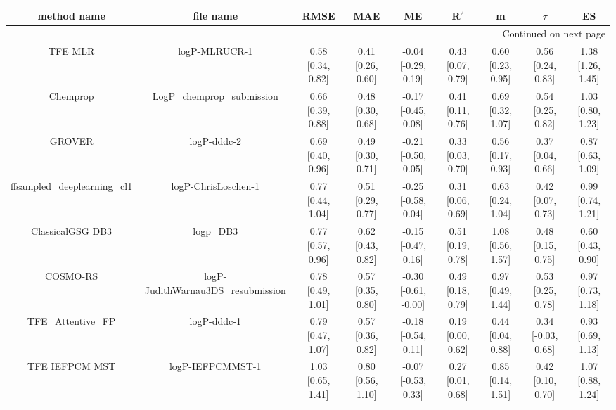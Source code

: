\documentclass{article}
\begin{document}
\begin{center}
\scriptsize
\begin{longtable}{|ccccccccc|}
\toprule
                method name &                                   file name &               RMSE &                MAE &                    ME &              R$^2$ &                     m &                $\tau$ &                    ES \\
\midrule
\endhead
\midrule
\multicolumn{9}{r}{{Continued on next page}} \\
\midrule
\endfoot

\bottomrule
\endlastfoot
                    TFE MLR &                               logP-MLRUCR-1 &  0.58 [0.34, 0.82] &  0.41 [0.26, 0.60] &   -0.04 [-0.29, 0.19] &  0.43 [0.07, 0.79] &     0.60 [0.23, 0.95] &     0.56 [0.24, 0.83] &     1.38 [1.26, 1.45] \\
                   Chemprop &                  LogP\_chemprop\_submission &  0.66 [0.39, 0.88] &  0.48 [0.30, 0.68] &   -0.17 [-0.45, 0.08] &  0.41 [0.11, 0.76] &     0.69 [0.32, 1.07] &     0.54 [0.25, 0.82] &     1.03 [0.80, 1.23] \\
                     GROVER &                                 logP-dddc-2 &  0.69 [0.40, 0.96] &  0.49 [0.30, 0.71] &   -0.21 [-0.50, 0.05] &  0.33 [0.03, 0.70] &     0.56 [0.17, 0.93] &     0.37 [0.04, 0.66] &     0.87 [0.63, 1.09] \\
 ffsampled_deeplearning_cl1 &                         logP-ChrisLoschen-1 &  0.77 [0.44, 1.04] &  0.51 [0.29, 0.77] &   -0.25 [-0.58, 0.04] &  0.31 [0.06, 0.69] &     0.63 [0.24, 1.04] &     0.42 [0.07, 0.73] &     0.99 [0.74, 1.21] \\
           ClassicalGSG DB3 &                                   logp\_DB3 &  0.77 [0.57, 0.96] &  0.62 [0.43, 0.82] &   -0.15 [-0.47, 0.16] &  0.51 [0.19, 0.78] &     1.08 [0.56, 1.57] &     0.48 [0.15, 0.75] &     0.60 [0.43, 0.90] \\
                   COSMO-RS &          logP-JudithWarnau3DS\_resubmission &  0.78 [0.49, 1.01] &  0.57 [0.35, 0.80] &  -0.30 [-0.61, -0.00] &  0.49 [0.18, 0.79] &     0.97 [0.49, 1.44] &     0.53 [0.25, 0.78] &     0.97 [0.73, 1.18] \\
           TFE_Attentive_FP &                                 logP-dddc-1 &  0.79 [0.47, 1.07] &  0.57 [0.36, 0.82] &   -0.18 [-0.54, 0.11] &  0.19 [0.00, 0.62] &     0.44 [0.04, 0.88] &    0.34 [-0.03, 0.68] &     0.93 [0.69, 1.13] \\
             TFE IEFPCM MST &                            logP-IEFPCMMST-1 &  1.03 [0.65, 1.41] &  0.80 [0.56, 1.10] &   -0.07 [-0.53, 0.33] &  0.27 [0.01, 0.68] &     0.85 [0.14, 1.51] &     0.42 [0.10, 0.70] &     1.07 [0.88, 1.24] \\

\end{longtable}
\end{center}
\end{document}
